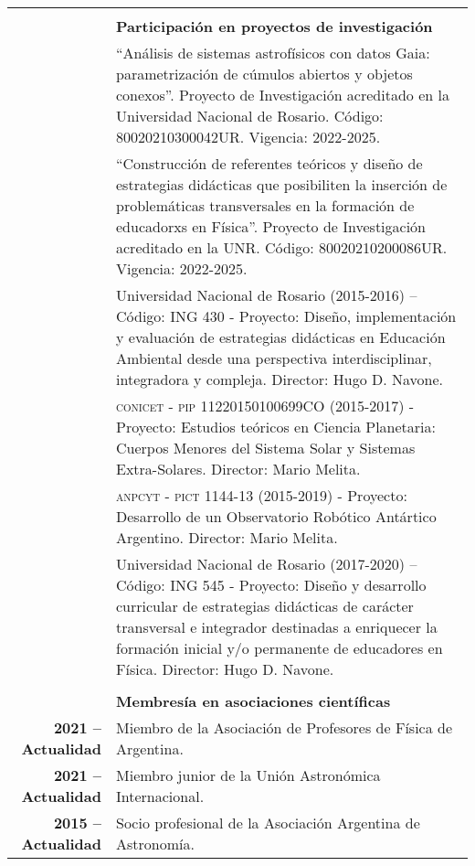 \documentclass[12pt,a4paper]{article}
\begin{document}
\begin{longtable}[t]{r p{12cm}}
  & \\
  & \textbf{Participación en proyectos de investigación} \\
 \cline{2-2}
  &  ``Análisis de sistemas astrofísicos con datos Gaia: parametrización de cúmulos abiertos y objetos conexos''. Proyecto de Investigación acreditado en la Universidad Nacional de Rosario. Código: 80020210300042UR. Vigencia: 2022-2025. \\
  & ``Construcción de referentes teóricos y diseño de estrategias didácticas que posibiliten la inserción de problemáticas transversales en la formación de educadorxs en Física''. Proyecto de Investigación acreditado en la UNR. Código: 80020210200086UR. Vigencia: 2022-2025. \\
  &  Universidad Nacional de Rosario (2015-2016) – Código: ING 430 - Proyecto: Diseño, implementación y evaluación de estrategias didácticas en Educación Ambiental desde una perspectiva interdisciplinar, integradora y compleja. Director: Hugo D. Navone. \\
  &  \textsc{conicet - pip} 11220150100699CO (2015-2017) - Proyecto: Estudios teóricos en Ciencia Planetaria: Cuerpos Menores del Sistema Solar y Sistemas Extra-Solares. Director: Mario Melita. \\
  & \textsc{anpcyt - pict 1144-13} (2015-2019) - Proyecto: Desarrollo de un Observatorio Robótico Antártico Argentino. Director: Mario Melita. \\
  & Universidad Nacional de Rosario (2017-2020) – Código: ING 545 - Proyecto: Diseño y desarrollo curricular de estrategias didácticas de carácter transversal e integrador destinadas a enriquecer la formación inicial y/o permanente de educadores en Física. Director: Hugo D. Navone. \\
 & \\
 & \textbf{Membresía en asociaciones científicas} \\
\cline{2-2}
\textbf{2021 -- Actualidad} & Miembro de la Asociación de Profesores de Física de Argentina. \\
\textbf{2021 -- Actualidad} & Miembro junior de la Unión Astronómica Internacional. \\
\textbf{2015 -- Actualidad} & Socio profesional de la Asociación Argentina de Astronomía. \\

\end{longtable}
\end{document}
